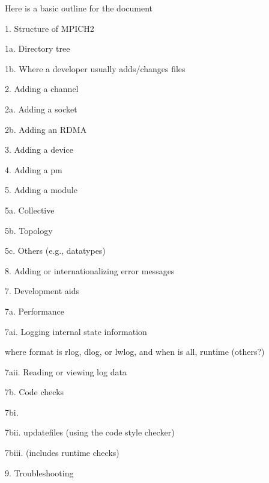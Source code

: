 \documentclass[dvipdfm,11pt]{article}
\begin{document}

\cleardoublepage

\tableofcontents
\clearpage

\pagestyle{headings}

Here is a basic outline for the document

1. Structure of MPICH2 

   1a. Directory tree

   1b. Where a developer usually adds/changes files

2. Adding a channel

2a. Adding a socket

2b. Adding an RDMA

3. Adding a device

4. Adding a pm

5. Adding a module

  5a. Collective

  

  5b. Topology

  5c. Others (e.g., datatypes)

8. Adding or internationalizing error messages

7. Development aids

  7a. Performance

      7ai. Logging internal state information
  

      where format is rlog, dlog, or lwlog, and when is all, runtime (others?)

      7aii. Reading or viewing log data

   7b. Code checks
 
      7bi. 

      7bii.  updatefiles (using the code style checker)

      7biii.  (includes runtime checks)

9. Troubleshooting
\end{document}
